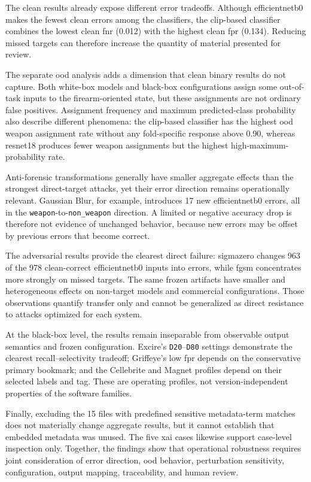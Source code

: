 The clean results already expose different error tradeoffs. Although
\gls{efficientnetb0} makes the fewest clean errors among the classifiers, the
\gls{clip}-based classifier combines the lowest clean \gls{fnr} (0.012) with the
highest clean \gls{fpr} (0.134). Reducing missed targets can therefore increase
the quantity of material presented for review.

The separate \gls{ood} analysis adds a dimension that clean binary results do
not capture. Both white-box models and black-box configurations assign some
out-of-task inputs to the firearm-oriented state, but these assignments are not
ordinary false positives. Assignment frequency and maximum predicted-class
probability also describe different phenomena: the \gls{clip}-based classifier has
the highest \gls{ood} weapon assignment rate without any fold-specific response
above 0.90, whereas \gls{resnet18} produces fewer weapon assignments but the
highest high-maximum-probability rate.

Anti-forensic transformations generally have smaller aggregate effects than the
strongest direct-target attacks, yet their error direction remains
operationally relevant. Gaussian Blur, for example, introduces 17 new
\gls{efficientnetb0} errors, all in the
\texttt{weapon}-to-\texttt{non\_weapon} direction. A limited or negative
accuracy drop is therefore not evidence of unchanged behavior, because new
errors may be offset by previous errors that become correct.

The adversarial results provide the clearest direct failure: \gls{sigmazero}
changes 963 of the 978 clean-correct \gls{efficientnetb0} inputs into errors,
while \gls{fgsm} concentrates more strongly on missed targets. The same frozen
artifacts have smaller and heterogeneous effects on non-target models and
commercial configurations. Those observations quantify transfer only and
cannot be generalized as direct resistance to attacks optimized for each
system.

At the black-box level, the results remain inseparable from observable output
semantics and frozen configuration. Excire's \texttt{D20}--\texttt{D80}
settings demonstrate the clearest recall--selectivity tradeoff; Griffeye's low
\gls{fpr} depends on the conservative primary bookmark; and the Cellebrite and
Magnet profiles depend on their selected labels and tag. These are operating
profiles, not version-independent properties of the software families.

Finally, excluding the 15 files with predefined sensitive metadata-term
matches does not materially change aggregate results, but it cannot establish
that embedded metadata was unused. The five \gls{xai} cases likewise support
case-level inspection only. Together, the findings show that operational
robustness requires joint consideration of error direction, \gls{ood}
behavior, perturbation sensitivity, configuration, output mapping,
traceability, and human review.



